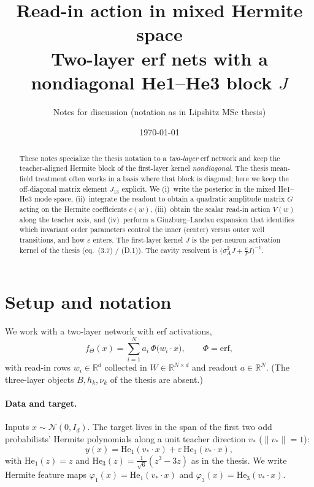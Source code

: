 \documentclass[11pt,a4paper]{article}
\title{Read-in action in mixed Hermite space\\
\large Two-layer erf nets with a nondiagonal He1--He3 block $J$}
\author{Notes for discussion (notation as in Lipshitz MSc thesis)}
\date{\today}
\begin{document}
\maketitle

\begin{abstract}
These notes specialize the thesis notation to a \emph{two-layer} erf network and keep the
teacher-aligned Hermite block of the first-layer kernel \emph{nondiagonal}.
The thesis mean-field treatment often works in a basis where that block is diagonal;
here we keep the off-diagonal matrix element $J_{13}$ explicit.
We (i)~write the posterior in the mixed He1--He3 mode space,
(ii)~integrate the readout to obtain a quadratic amplitude matrix $G$ acting on
the Hermite coefficients $c(w)$,
(iii)~obtain the scalar read-in action $V(w)$ along the teacher axis, and
(iv)~perform a Ginzburg--Landau expansion that identifies which invariant order
parameters control the inner (center) versus outer well transitions, and how
$\varepsilon$ enters.
The first-layer kernel $J$ is the per-neuron activation kernel of the thesis
(eq.~(3.7) / (D.1)).
The cavity resolvent is
$\bigl(\sigma_A^2 J+\tfrac{\kappa}{P}I\bigr)^{-1}$.
\end{abstract}

\tableofcontents
\vspace{1em}

\section{Setup and notation}

We work with a two-layer network with erf activations,
\begin{equation}
  f_\Theta(x)
  =
  \sum_{i=1}^{N}
  a_i\,
  \Phi\!\bigl(w_i\cdot x\bigr),
  \qquad
  \Phi=\mathrm{erf},
\end{equation}
with read-in rows $w_i\in\mathbb{R}^d$ collected in $W\in\mathbb{R}^{N\times d}$ and
readout $a\in\mathbb{R}^{N}$.
(The three-layer objects $B,h_k,\nu_k$ of the thesis are absent.)

\paragraph{Data and target.}
Inputs $x\sim\mathcal{N}(0,I_d)$.
The target lives in the span of the first two odd probabilists' Hermite polynomials
along a unit teacher direction $v_\ast$ ($\lVert v_\ast\rVert=1$):
\begin{equation}
  y(x)
  =
  \mathrm{He}_1(v_\ast\cdot x)
  +
  \varepsilon\,
  \mathrm{He}_3(v_\ast\cdot x),
  \label{eq:target}
\end{equation}
with $\mathrm{He}_1(z)=z$ and
$\mathrm{He}_3(z)=\tfrac{1}{\sqrt{6}}(z^3-3z)$ as in the thesis.
We write Hermite feature maps $\varphi_1(x)=\mathrm{He}_1(v_\ast\cdot x)$ and
$\varphi_3(x)=\mathrm{He}_3(v_\ast\cdot x)$.
\end{document}
